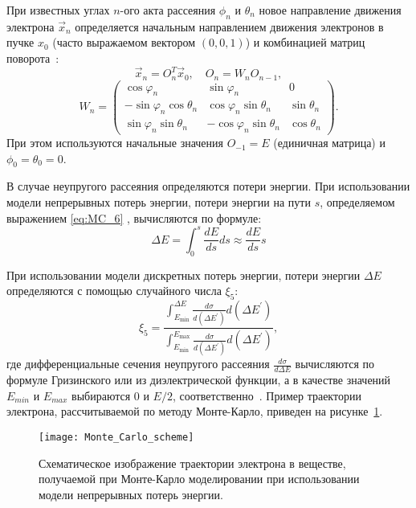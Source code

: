 При известных углах $n$-ого акта рассеяния $\phi_n$ и $\theta_n$ новое направление движения электрона $\vec{x}_n$ определяется начальным направлением движения электронов в пучке $x_0$ (часто выражаемом вектором $(0,0,1)$) и комбинацией матриц поворота~\cite{rotation_matrices}:
\begin{equation} \label{eq:MC_13}
	\vec{x}_n=O_n^T \vec{x}_0, \quad O_n=W_n O_{n-1},
\end{equation}
\begin{equation} \label{eq:MC_14}
	W_n=\left(\begin{array}{ccc}
		\cos \varphi_n & \sin \varphi_n & 0 \\
		-\sin \varphi_n \cos \theta_n & \cos \varphi_n \sin \theta_n & \sin \theta_n \\
		\sin \varphi_n \sin \theta_n & -\cos \varphi_n \sin \theta_n & \cos \theta_n
	\end{array}\right).
\end{equation}
При этом используются начальные значения $O_{-1} = E$ (единичная матрица) и $\phi_0 = \theta_0 = 0$.

В случае неупругого рассеяния определяются потери энергии. При использовании модели непрерывных потерь энергии, потери энергии на пути $s$, определяемом выражением \ref{eq:MC_6} , вычисляются по формуле:
\begin{equation} \label{eq:MC_15}
	\Delta E=\int_0^s \frac{d E}{d s} d s \approx \frac{d E}{d s} s
\end{equation}

При использовании модели дискретных потерь энергии, потери энергии $\Delta E$ определяются с помощью случайного числа $\xi_5$:
\begin{equation} \label{eq:MC_16}
	\xi_5 = \frac
	{\displaystyle \int_{E_{\min }}^{\Delta E} \frac{d \sigma}{d\left(\Delta E^{\prime}\right)} d\left(\Delta E^{\prime}\right)}
	{\displaystyle \int_{E_{\min }}^{E_{\max }} \frac{d \sigma}{d\left(\Delta E^{\prime}\right)} d\left(\Delta E^{\prime}\right)},
\end{equation}
где дифференциальные сечения неупругого рассеяния $\frac{d \sigma}{d \Delta E}$ вычисляются по формуле Гризинского или из диэлектрической функции, а в качестве значений $E_{min}$ и $E_{max}$ выбираются $0$ и $E/2$, соответственно~\cite{Dapor_large_book}. Пример траектории электрона, рассчитываемой по методу Монте-Карло, приведен на рисунке~\ref{fig:Monte_Carlo_scheme}.

\begin{figure}
	\centering
	\texttt{[image: Monte\_Carlo\_scheme]}
	\caption{Схематическое изображение траектории электрона в веществе, получаемой при Монте-Карло моделировании при использовании модели непрерывных потерь энергии.}
	\label{fig:Monte_Carlo_scheme}
\end{figure}
